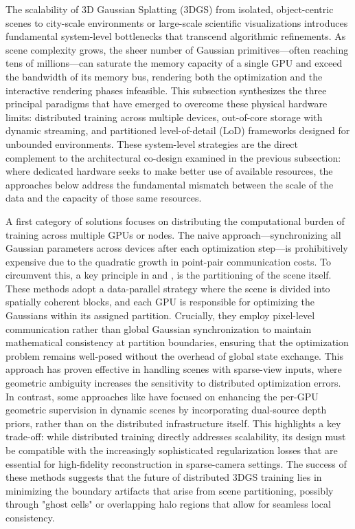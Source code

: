 \documentclass[11pt,a4paper]{article}
\begin{document}
The scalability of 3D Gaussian Splatting (3DGS) from isolated, object-centric scenes to city-scale environments or large-scale scientific visualizations introduces fundamental system-level bottlenecks that transcend algorithmic refinements. As scene complexity grows, the sheer number of Gaussian primitives---often reaching tens of millions---can saturate the memory capacity of a single GPU and exceed the bandwidth of its memory bus, rendering both the optimization and the interactive rendering phases infeasible. This subsection synthesizes the three principal paradigms that have emerged to overcome these physical hardware limits: distributed training across multiple devices, out-of-core storage with dynamic streaming, and partitioned level-of-detail (LoD) frameworks designed for unbounded environments. These system-level strategies are the direct complement to the architectural co-design examined in the previous subsection: where dedicated hardware seeks to make better use of available resources, the approaches below address the fundamental mismatch between the scale of the data and the capacity of those same resources.

A first category of solutions focuses on distributing the computational burden of training across multiple GPUs or nodes. The naive approach---synchronizing all Gaussian parameters across devices after each optimization step---is prohibitively expensive due to the quadratic growth in point-pair communication costs. To circumvent this, a key principle in \cite{arxiv:2509.23258v2} and \cite{arxiv:2605.11424v1}, is the partitioning of the scene itself. These methods adopt a data-parallel strategy where the scene is divided into spatially coherent blocks, and each GPU is responsible for optimizing the Gaussians within its assigned partition. Crucially, they employ pixel-level communication rather than global Gaussian synchronization to maintain mathematical consistency at partition boundaries, ensuring that the optimization problem remains well-posed without the overhead of global state exchange. This approach has proven effective in handling scenes with sparse-view inputs, where geometric ambiguity increases the sensitivity to distributed optimization errors. In contrast, some approaches like \cite{arxiv:2608.01588v1} have focused on enhancing the per-GPU geometric supervision in dynamic scenes by incorporating dual-source depth priors, rather than on the distributed infrastructure itself. This highlights a key trade-off: while distributed training directly addresses scalability, its design must be compatible with the increasingly sophisticated regularization losses that are essential for high-fidelity reconstruction in sparse-camera settings. The success of these methods suggests that the future of distributed 3DGS training lies in minimizing the boundary artifacts that arise from scene partitioning, possibly through "ghost cells" or overlapping halo regions that allow for seamless local consistency.
\end{document}
